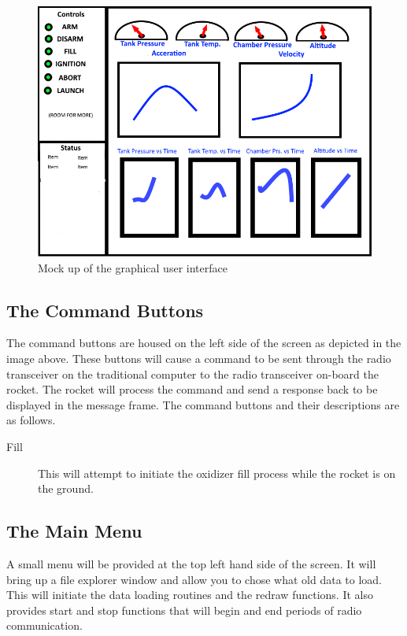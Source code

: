 \documentclass[10pt,draftclsnofoot,onecolumn,compsoc]{IEEEtran}
\begin{document}
\begin{figure}[!ht]
  \caption{Mock up of the graphical user interface}
  \centering
	\includegraphics[scale=.85]{HyRoUIMockup}
\end{figure}

\subsection{The Command Buttons}
The command buttons are housed on the left side of the screen as depicted in the image above. These buttons will cause a command to be sent through the radio transceiver on the traditional computer to the radio transceiver on-board the rocket. The rocket will process the command and send a response back to be displayed in the message frame. The command buttons and their descriptions are as follows.\par

\begin{description}
\item[Fill] This will attempt to initiate the oxidizer fill process while the rocket is on the ground.
\end{description}

\subsection{The Main Menu}
A small menu will be provided at the top left hand side of the screen. It will bring up a file explorer window and allow you to chose what old data to load. This will initiate the data loading routines and the redraw functions. It also provides start and stop functions that will begin and end periods of radio communication. 
\end{document}
